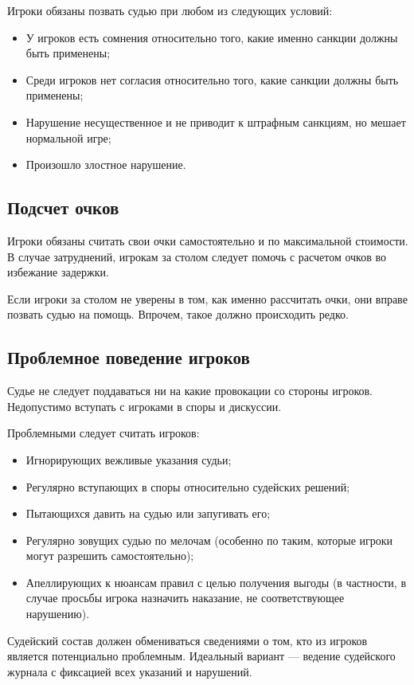 Игроки обязаны позвать судью при любом из следующих условий:
\begin{itemize}
	\item У игроков есть сомнения относительно того, какие именно санкции должны быть применены;
	\item Среди игроков нет согласия относительно того, какие санкции должны быть применены;
	\item Нарушение несущественное и не приводит к штрафным санкциям, но мешает нормальной игре;
	\item Произошло злостное нарушение.
\end{itemize}

\subsection{Подсчет очков}

Игроки обязаны считать свои очки самостоятельно и по максимальной стоимости. В случае затруднений, игрокам за столом следует помочь с расчетом очков во избежание задержки.

Если игроки за столом не уверены в том, как именно рассчитать очки, они вправе позвать судью на помощь. Впрочем, такое должно происходить редко.

\subsection{Проблемное поведение игроков}

Судье не следует поддаваться ни на какие провокации со стороны игроков. Недопустимо вступать с игроками в споры и дискуссии. 

Проблемными следует считать игроков:
\begin{itemize}
	\item Игнорирующих вежливые указания судьи;
	\item Регулярно вступающих в споры относительно судейских решений;
	\item Пытающихся давить на судью или запугивать его;
	\item Регулярно зовущих судью по мелочам (особенно по таким, которые игроки могут разрешить самостоятельно);
	\item Апеллирующих к нюансам правил с целью получения выгоды (в частности, в случае просьбы игрока назначить наказание, не соответствующее нарушению).
\end{itemize}

Судейский состав должен обмениваться сведениями о том, кто из игроков является потенциально проблемным. Идеальный вариант --- ведение судейского журнала с фиксацией всех указаний и нарушений.

